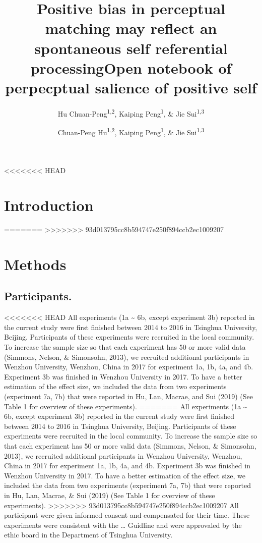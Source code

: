 \documentclass[
  man]{apa6}
\title{Positive bias in perceptual matching may reflect an spontaneous self referential processing}
\author{Hu Chuan-Peng\textsuperscript{1,2}, Kaiping Peng\textsuperscript{1}, \& Jie Sui\textsuperscript{1,3}}
\date{}
\affiliation{
\vspace{0.5cm}
\textsuperscript{1} Tsinghua University, 100084 Beijing, China\\\textsuperscript{2} German Resilience Center, 55131 Mainz, Germany\\\textsuperscript{3} University of Aberdeen, Aberdeen, Scotland}
\title{Open notebook of perpecptual salience of positive self}
\author{Chuan-Peng Hu\textsuperscript{1,2}, Kaiping Peng\textsuperscript{1}, \& Jie Sui\textsuperscript{1,3}}
\date{}
\begin{document}
\maketitle

<<<<<<< HEAD
\hypertarget{introduction}{%
\section{Introduction}\label{introduction}}

=======
>>>>>>> 93d013795cc8b594747e250f894ccb2ec1009207
\hypertarget{methods}{%
\section{Methods}\label{methods}}

\hypertarget{participants.}{%
\subsection{Participants.}\label{participants.}}

<<<<<<< HEAD
All experiments (1a \textasciitilde{} 6b, except experiment 3b) reported in the current study were first finished between 2014 to 2016 in Tsinghua University, Beijing. Participants of these experiments were recruited in the local community. To increase the sample size so that each experiment has 50 or more valid data (Simmons, Nelson, \& Simonsohn, 2013), we recruited additional participants in Wenzhou University, Wenzhou, China in 2017 for experiment 1a, 1b, 4a, and 4b. Experiment 3b was finished in Wenzhou University in 2017. To have a better estimation of the effect size, we included the data from two experiments (experiment 7a, 7b) that were reported in Hu, Lan, Macrae, and Sui (2019) (See Table 1 for overview of these experiments).
=======
All experiments (1a \textasciitilde{} 6b, except experiment 3b) reported in the current study were first finished between 2014 to 2016 in Tsinghua University, Beijing. Participants of these experiments were recruited in the local community. To increase the sample size so that each experiment has 50 or more valid data (Simmons, Nelson, \& Simonsohn, 2013), we recruited additional participants in Wenzhou University, Wenzhou, China in 2017 for experiment 1a, 1b, 4a, and 4b. Experiment 3b was finished in Wenzhou University in 2017. To have a better estimation of the effect size, we included the data from two experiments (experiment 7a, 7b) that were reported in Hu, Lan, Macrae, \& Sui (2019) (See Table 1 for overview of these experiments).
>>>>>>> 93d013795cc8b594747e250f894ccb2ec1009207
All participant were given informed consent and compensated for their time. These experiments were consistent with the \ldots{} Guidline and were approvaled by the ethic board in the Department of Tsinghua University.
\end{document}
